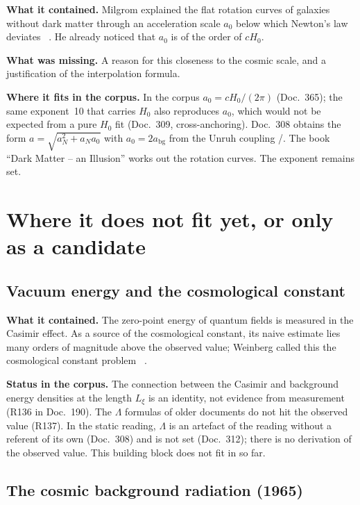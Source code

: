 \textbf{What it contained.} Milgrom explained the flat rotation curves of galaxies without dark
matter through an acceleration scale $a_0$ below which Newton's law deviates \QM~\cite{Milgrom1983}.
He already noticed that $a_0$ is of the order of $cH_0$.

\textbf{What was missing.} A reason for this closeness to the cosmic scale, and a justification of
the interpolation formula.

\textbf{Where it fits in the corpus.} In the corpus $a_0=cH_0/(2\pi)$ \KM{} (Doc.~365); the same
exponent~10 that carries $H_0$ also reproduces $a_0$, which would not be expected from a pure $H_0$
fit (Doc.~309, cross-anchoring). Doc.~308 obtains the form $a=\sqrt{a_N^2+a_N a_0}$ with
$a_0=2a_{\mathrm{bg}}$ from the Unruh coupling \KM/\SM. The book \enquote{Dark Matter -- an
Illusion} works out the rotation curves. The exponent remains set.

\section{Where it does not fit yet, or only as a candidate}

\subsection{Vacuum energy and the cosmological constant}

\textbf{What it contained.} The zero-point energy of quantum fields is measured in the Casimir
effect. As a source of the cosmological constant, its naive estimate lies many orders of magnitude
above the observed value; Weinberg called this the cosmological constant problem
\QM~\cite{Weinberg1989}.

\textbf{Status in the corpus.} The connection between the Casimir and background energy densities at
the length $L_\xi$ is an identity, not evidence from measurement \SM{} (R136 in Doc.~190). The
$\Lambda$ formulas of older documents do not hit the observed value \XM{} (R137). In the static
reading, $\Lambda$ is an artefact of the reading without a referent of its own (Doc.~308) and is not
set (Doc.~312); there is no derivation of the observed value. This building block does not fit in
so far.

\subsection{The cosmic background radiation (1965)}

